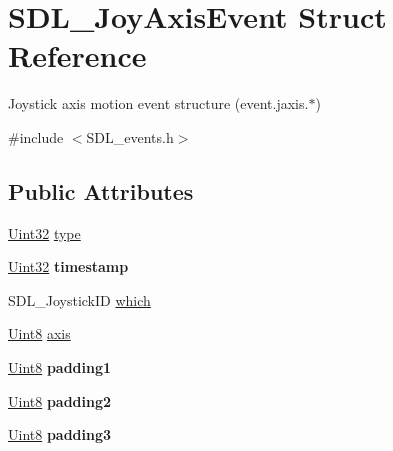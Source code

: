 \hypertarget{struct_s_d_l___joy_axis_event}{}\section{S\+D\+L\+\_\+\+Joy\+Axis\+Event Struct Reference}
\label{struct_s_d_l___joy_axis_event}


Joystick axis motion event structure (event.\+jaxis.$\ast$)  




{\ttfamily \#include $<$S\+D\+L\+\_\+events.\+h$>$}

\subsection*{Public Attributes}
\begin{DoxyCompactItemize}
\item 
\hyperlink{_s_d_l__stdinc_8h_add440eff171ea5f55cb00c4a9ab8672d}{Uint32} \hyperlink{struct_s_d_l___joy_axis_event_aed1c873fb90ba58194e65f972933c67d}{type}
\item 
\hypertarget{struct_s_d_l___joy_axis_event_a60ecfc70df9eeef8e33b5dd7dc060389}{}\hyperlink{_s_d_l__stdinc_8h_add440eff171ea5f55cb00c4a9ab8672d}{Uint32} {\bfseries timestamp}\label{struct_s_d_l___joy_axis_event_a60ecfc70df9eeef8e33b5dd7dc060389}

\item 
S\+D\+L\+\_\+\+Joystick\+I\+D \hyperlink{struct_s_d_l___joy_axis_event_a965719f4703a7091bcc5f07f79fcf7e1}{which}
\item 
\hyperlink{_s_d_l__stdinc_8h_a2944638813a090aa23e62f4da842c3e2}{Uint8} \hyperlink{struct_s_d_l___joy_axis_event_a0beac2fb161e45771c424bd0b6daeabb}{axis}
\item 
\hypertarget{struct_s_d_l___joy_axis_event_ae8e17bced478530638982f0382a0dafa}{}\hyperlink{_s_d_l__stdinc_8h_a2944638813a090aa23e62f4da842c3e2}{Uint8} {\bfseries padding1}\label{struct_s_d_l___joy_axis_event_ae8e17bced478530638982f0382a0dafa}

\item 
\hypertarget{struct_s_d_l___joy_axis_event_ad5407250032f618fde7437ac5f229257}{}\hyperlink{_s_d_l__stdinc_8h_a2944638813a090aa23e62f4da842c3e2}{Uint8} {\bfseries padding2}\label{struct_s_d_l___joy_axis_event_ad5407250032f618fde7437ac5f229257}

\item 
\hypertarget{struct_s_d_l___joy_axis_event_a8bf5144fddc19686c2003add1f0e1565}{}\hyperlink{_s_d_l__stdinc_8h_a2944638813a090aa23e62f4da842c3e2}{Uint8} {\bfseries padding3}\label{struct_s_d_l___joy_axis_event_a8bf5144fddc19686c2003add1f0e1565}


\end{DoxyCompactItemize}
